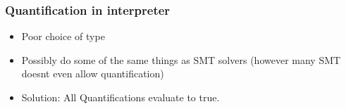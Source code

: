 \begin{frame}[c]
  \frametitle{Quantification in interpreter}
  \begin{itemize}
    \item Poor choice of type
    \item Possibly do some of the same things as SMT solvers (however many SMT doesnt even allow quantification)
    \item Solution: All Quantifications evaluate to true.
  \end{itemize}
\end{frame}
